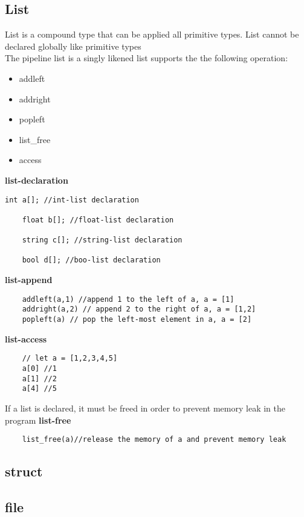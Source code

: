 \documentclass[./Report_main.tex]{subfiles}
\begin{document}
\subsection{List}
List is a compound type that can be applied all primitive types. List cannot be declared globally like primitive types\\
The pipeline list is a singly likened list supports the the following operation:\\
\begin{itemize}
    \item addleft
    \item addright
    \item popleft
    \item list\_free
    \item access
\end{itemize}
\textbf{list-declaration}
\begin{lstlisting}[]
    int a[]; //int-list declaration
    
    float b[]; //float-list declaration
    
    string c[]; //string-list declaration
    
    bool d[]; //boo-list declaration
\end{lstlisting}
\textbf{list-append}
\begin{lstlisting}
    addleft(a,1) //append 1 to the left of a, a = [1]
    addright(a,2) // append 2 to the right of a, a = [1,2]
    popleft(a) // pop the left-most element in a, a = [2]
\end{lstlisting}
\textbf{list-access}
\begin{lstlisting}
    // let a = [1,2,3,4,5]
    a[0] //1
    a[1] //2
    a[4] //5
\end{lstlisting}
If a list is declared, it must be freed in order to prevent memory leak in the program
\textbf{list-free}
\begin{lstlisting}
    list_free(a)//release the memory of a and prevent memory leak
\end{lstlisting}
\subsection{struct}
\subsection{file}
\end{document}
